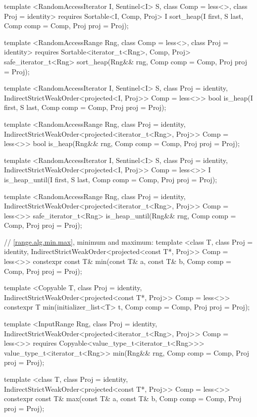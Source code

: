 {\begin{codeblock}
{{    template <RandomAccessIterator I, Sentinel<I> S, class Comp = less<>,
        class Proj = identity>
      requires Sortable<I, Comp, Proj>
      I sort_heap(I first, S last, Comp comp = Comp{}, Proj proj = Proj{});

    template <RandomAccessRange Rng, class Comp = less<>, class Proj = identity>
      requires Sortable<iterator_t<Rng>, Comp, Proj>
      safe_iterator_t<Rng>
        sort_heap(Rng&& rng, Comp comp = Comp{}, Proj proj = Proj{});

    template <RandomAccessIterator I, Sentinel<I> S, class Proj = identity,
        IndirectStrictWeakOrder<projected<I, Proj>> Comp = less<>>
      bool is_heap(I first, S last, Comp comp = Comp{}, Proj proj = Proj{});

    template <RandomAccessRange Rng, class Proj = identity,
        IndirectStrictWeakOrder<projected<iterator_t<Rng>, Proj>> Comp = less<>>
      bool is_heap(Rng&& rng, Comp comp = Comp{}, Proj proj = Proj{});

    template <RandomAccessIterator I, Sentinel<I> S, class Proj = identity,
        IndirectStrictWeakOrder<projected<I, Proj>> Comp = less<>>
      I is_heap_until(I first, S last, Comp comp = Comp{}, Proj proj = Proj{});

    template <RandomAccessRange Rng, class Proj = identity,
        IndirectStrictWeakOrder<projected<iterator_t<Rng>, Proj>> Comp = less<>>
      safe_iterator_t<Rng>
        is_heap_until(Rng&& rng, Comp comp = Comp{}, Proj proj = Proj{});

    // \ref{range.alg.min.max}, minimum and maximum:
    template <class T, class Proj = identity,
        IndirectStrictWeakOrder<projected<const T*, Proj>> Comp = less<>>
      constexpr const T& min(const T& a, const T& b, Comp comp = Comp{}, Proj proj = Proj{});

    template <Copyable T, class Proj = identity,
        IndirectStrictWeakOrder<projected<const T*, Proj>> Comp = less<>>
      constexpr T min(initializer_list<T> t, Comp comp = Comp{}, Proj proj = Proj{});

    template <InputRange Rng, class Proj = identity,
        IndirectStrictWeakOrder<projected<iterator_t<Rng>, Proj>> Comp = less<>>
      requires Copyable<value_type_t<iterator_t<Rng>>>
      value_type_t<iterator_t<Rng>>
        min(Rng&& rng, Comp comp = Comp{}, Proj proj = Proj{});

    template <class T, class Proj = identity,
        IndirectStrictWeakOrder<projected<const T*, Proj>> Comp = less<>>
      constexpr const T& max(const T& a, const T& b, Comp comp = Comp{}, Proj proj = Proj{});

}}
\end{codeblock}}
